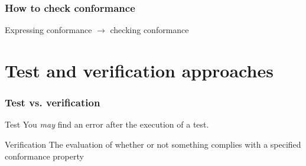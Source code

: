 \documentclass{beamer}
\begin{document}
\begin{frame}
\frametitle{How to check conformance}

\Large{Expressing conformance $\xrightarrow{\ }$ checking conformance}

\end{frame}

\section{Test and verification approaches}
\begin{frame}
\frametitle{Test vs. verification}
\begin{block}{Test}
You \textit{may} find an error after the execution of a test.
\end{block}
\begin{block}{Verification}
The evaluation of whether or not something complies with a
specified conformance property
\end{block}
\end{frame}
\end{document}
